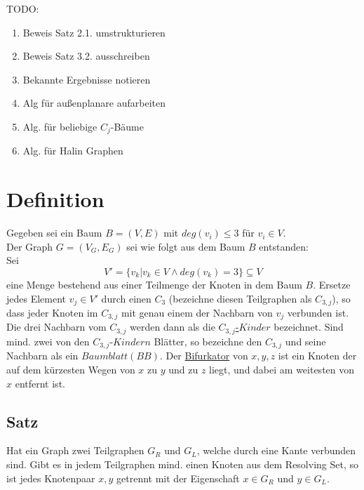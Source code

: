 \documentclass{article}
\begin{document}
TODO:
\begin{enumerate}
\item Beweis Satz 2.1. umstrukturieren
\item Beweis Satz 3.2. ausschreiben
\item Bekannte Ergebnisse notieren
\item Alg für außenplanare aufarbeiten 
\item Alg. für beliebige $C_j$-Bäume
\item Alg. für Halin Graphen
\end{enumerate}


\section{Definition}
Gegeben sei ein Baum $B=(V,E)$ mit $deg(v_i)\leq 3$ für $v_i \in V$.\\
   Der Graph $G=(V_G,E_G)$ sei wie folgt aus dem Baum $B$ entstanden:\\
   Sei $$V'=\{v_k|v_k \in V \wedge deg(v_k)=3\}\subseteq V$$ eine Menge bestehend aus einer Teilmenge der Knoten in dem Baum $B$. Ersetze jedes Element $v_j \in V'$ durch einen $C_3$ (bezeichne diesen Teilgraphen als \underline{$C_{3,j}$}), so dass jeder Knoten im $C_{3,j}$ mit genau einem der Nachbarn von $v_j$ verbunden ist. Die drei Nachbarn vom $C_{3,j}$ werden dann als die \underline{$C_{3,j}$-$Kinder$} bezeichnet. Sind mind. zwei von den $C_{3,j}$-$Kindern$ Blätter, so bezeichne den $C_{3,j}$ und seine Nachbarn als ein \underline{$Baumblatt(BB)$}. Der \underline{Bifurkator} von $x,y,z$ ist ein Knoten der auf dem kürzesten Wegen von $x$ zu $y$ und zu $z$ liegt, und dabei am weitesten von $x$ entfernt ist.
\subsection{Satz}
Hat ein Graph zwei Teilgraphen $G_R$ und $G_L$, welche durch eine Kante verbunden sind. Gibt es in jedem Teilgraphen mind. einen Knoten aus dem Resolving Set, so ist jedes Knotenpaar $x,y$ getrennt mit der Eigenschaft $x \in G_R$ und $y \in G_L$.
\end{document}
